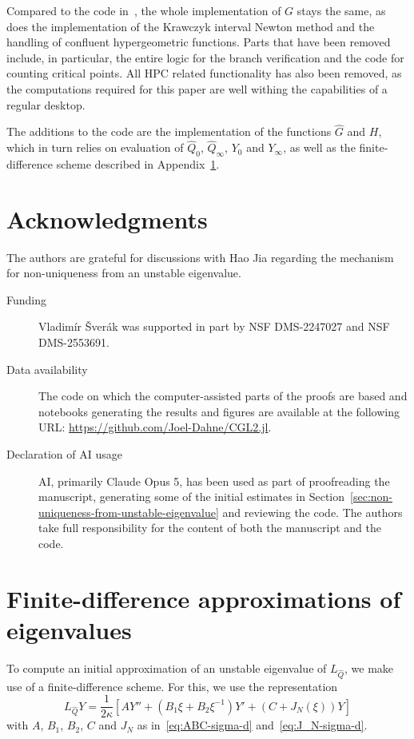 \documentclass[11pt]{article}
\begin{document}
Compared to the code in~\cite{CGL.jl}, the whole implementation of
\(G\) stays the same, as does the implementation of the Krawczyk
interval Newton method and the handling of confluent hypergeometric
functions. Parts that have been removed include, in particular, the
entire logic for the branch verification and the code for counting
critical points. All HPC related functionality has also been removed,
as the computations required for this paper are well withing the
capabilities of a regular desktop.

The additions to the code are the implementation of the functions
\(\hat{G}\) and \(H\), which in turn relies on evaluation of
\(\hat{Q}_{0}\), \(\hat{Q}_{\infty}\), \(Y_{0}\) and \(Y_{\infty}\),
as well as the finite-difference scheme described in
Appendix~\ref{sec:finite-differences-approximations}.

\section*{Acknowledgments}
The authors are grateful for discussions with Hao Jia regarding the
mechanism for non-uniqueness from an unstable eigenvalue.

\begin{description}
\item[Funding] Vladimír Šverák was supported in part by NSF
  DMS-2247027 and NSF DMS-2553691.
\item[Data availability] The code on which the computer-assisted parts
  of the proofs are based and notebooks generating the results and
  figures are available at the following URL:
  \url{https://github.com/Joel-Dahne/CGL2.jl}.
\item[Declaration of AI usage] AI, primarily Claude Opus 5, has been
  used as part of proofreading the manuscript, generating some of the
  initial estimates in
  Section~\ref{sec:non-uniqueness-from-unstable-eigenvalue} and
  reviewing the code. The authors take full responsibility for the
  content of both the manuscript and the code.
\end{description}

\appendix

\section{Finite-difference approximations of eigenvalues}
\label{sec:finite-differences-approximations}

To compute an initial approximation of an unstable eigenvalue of
\(L_{\hat{Q}}\), we make use of a finite-difference scheme. For this,
we use the representation
\begin{equation*}
  L_{\hat{Q}}Y = \frac{1}{2\kappa}\left[AY'' + (B_{1}\xi + B_{2}\xi^{-1})Y' + (C + J_{N}(\xi))Y\right]
\end{equation*}
with \(A\), \(B_{1}\), \(B_{2}\), \(C\) and \(J_{N}\) as
in~\eqref{eq:ABC-sigma-d} and~\eqref{eq:J_N-sigma-d}.
\end{document}
